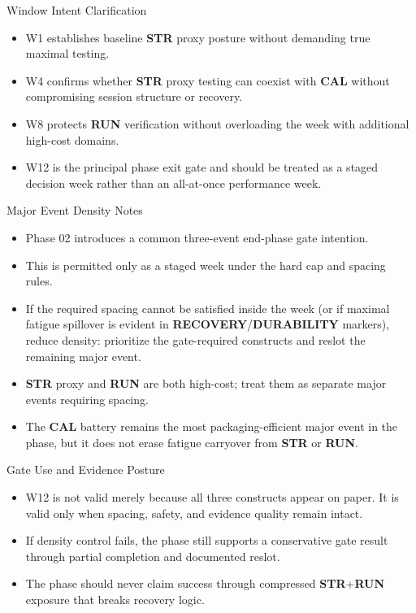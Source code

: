 \documentclass[10pt]{article}
\begin{document}
Window Intent Clarification

\begin{itemize}
\item W1 establishes baseline \textbf{STR} proxy posture without demanding true maximal testing.
\item W4 confirms whether \textbf{STR} proxy testing can coexist with \textbf{CAL} without compromising session structure or recovery.
\item W8 protects \textbf{RUN} verification without overloading the week with additional high-cost domains.
\item W12 is the principal phase exit gate and should be treated as a staged decision week rather than an all-at-once performance week.
\end{itemize}

Major Event Density Notes

\begin{itemize}
\item Phase 02 introduces a common three-event end-phase gate intention.
\item This is permitted only as a staged week under the hard cap and spacing rules.
\item If the required spacing cannot be satisfied inside the week (or if maximal fatigue spillover is evident in \textbf{RECOVERY}/\textbf{DURABILITY} markers), reduce density: prioritize the gate-required constructs and reslot the remaining major event.
\item \textbf{STR} proxy and \textbf{RUN} are both high-cost; treat them as separate major events requiring spacing.
\item The \textbf{CAL} battery remains the most packaging-efficient major event in the phase, but it does not erase fatigue carryover from \textbf{STR} or \textbf{RUN}.
\end{itemize}

Gate Use and Evidence Posture

\begin{itemize}
\item W12 is not valid merely because all three constructs appear on paper. It is valid only when spacing, safety, and evidence quality remain intact.
\item If density control fails, the phase still supports a conservative gate result through partial completion and documented reslot.
\item The phase should never claim success through compressed \textbf{STR}+\textbf{RUN} exposure that breaks recovery logic.
\end{itemize}
\end{document}
